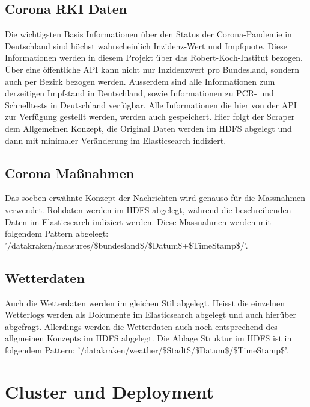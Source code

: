 \documentclass[12pt,oneside,a4paper,parskip]{scrbook}
\begin{document}
\section{Corona RKI Daten}
Die wichtigsten Basis Informationen \"uber den Status der Corona-Pandemie in Deutschland sind h\"ochst wahrscheinlich Inzidenz-Wert und Impfquote. Diese Informationen werden in diesem Projekt \"uber das Robert-Koch-Institut bezogen. \"Uber eine \"offentliche API kann nicht nur Inzidenzwert pro Bundesland, sondern auch per Bezirk bezogen werden. Ausserdem sind alle Informationen zum derzeitigen Impfstand in Deutschland, sowie Informationen zu PCR- und Schnelltests in Deutschland verf\"ugbar. Alle Informationen die hier von der API zur Verf\"ugung gestellt werden, werden auch gespeichert. Hier folgt der Scraper dem Allgemeinen Konzept, die Original Daten werden im HDFS abgelegt und dann mit minimaler Ver\"anderung im Elasticsearch indiziert.
\section{Corona Maßnahmen}
Das soeben erw\"ahnte Konzept der Nachrichten wird genauso f\"ur die Massnahmen verwendet. Rohdaten werden im HDFS abgelegt, w\"ahrend die beschreibenden Daten im Elasticsearch indiziert werden. Diese Massnahmen werden mit folgendem Pattern abgelegt: '/datakraken/measures/\$bundesland\$/\$Datum\$+\$TimeStamp\$/'.
\section{Wetterdaten}
Auch die Wetterdaten werden im gleichen Stil abgelegt. Heisst die einzelnen Wetterlogs werden als Dokumente im Elasticsearch abgelegt und auch hier\"uber abgefragt. Allerdings werden die Wetterdaten auch noch entsprechend des allgmeinen Konzepts im HDFS abgelegt. Die Ablage Struktur im HDFS ist in folgendem Pattern:  '/datakraken/weather/\$Stadt\$/\$Datum\$/\$TimeStamp\$'.

\chapter{Cluster und Deployment}
\end{document}
